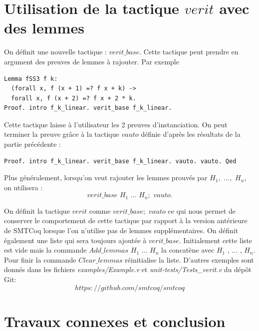 \documentclass[11pt]{article}
\begin{document}
\section{Utilisation de la tactique $verit$ avec des lemmes}

On définit une nouvelle tactique : $verit\_base$. Cette tactique peut prendre en argument des preuves de lemmes à rajouter. Par exemple 

\begin{lstlisting}[frame=single]
Lemma fSS3 f k:
  (forall x, f (x + 1) =? f x + k) ->
  forall x, f (x + 2) =? f x + 2 * k.
Proof. intro f_k_linear. verit_base f_k_linear.
\end{lstlisting}
Cette tactique laisse à l'utilisateur les 2 preuves d'instanciation. On peut terminer la preuve grâce à la tactique $vauto$ définie d'après les résultats de la partie précédente : 
\begin{lstlisting}[frame=single]
Proof. intro f_k_linear. verit_base f_k_linear. vauto. vauto. Qed
\end{lstlisting}

Plus généralement, lorsqu'on veut rajouter les lemmes prouvés par $H_1, \,\,...,\,\, H_n$, on utilisera : \[verit\_base\,\, H_1 \,\,...\,\, H_n; \,\,vauto.\]

On définit la tactique $verit$ comme $verit\_base; \,\,vauto$ ce qui nous permet de conserver le comportement de cette tactique par rapport à la version antérieure de SMTCoq lorsque l'on n'utilise pas de lemmes supplémentaires. On définit également une liste qui sera toujours ajoutée à $verit\_base$. Initialement cette liste est vide mais la commande $Add\_lemmas \,\,H_1 \,\,... \,\,H_n$ la concatène avec $H_1$ ,\,\,... ,\,\,$H_n$. Pour finir la commande $Clear\_lemmas$ réinitialise la liste. D'autres exemples sont donnés dans les fichiers \textit{examples/Example.v} et \textit{unit-tests/Tests\_verit.v} du dépôt Git: \[https://github.com/smtcoq/smtcoq\]


\section{Travaux connexes et conclusion}
\end{document}

